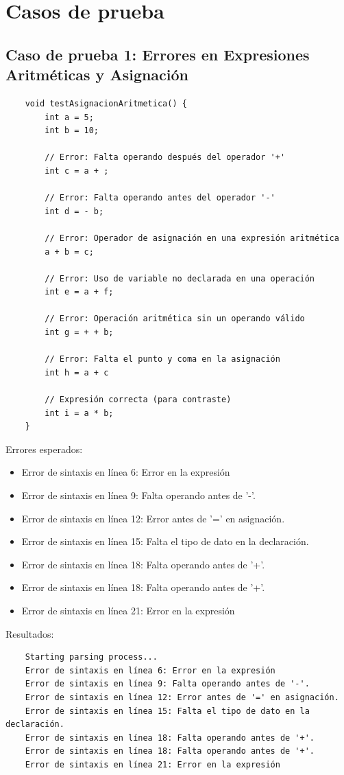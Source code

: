 \documentclass[a4paper,12pt]{article}
\begin{document}
\newpage

\section*{Casos de prueba}
\subsection*{Caso de prueba 1: Errores en Expresiones Aritméticas y Asignación}
\begin{flushleft}
    \begin{verbatim}
	void testAsignacionAritmetica() {
		int a = 5;
		int b = 10;
		
		// Error: Falta operando después del operador '+'
		int c = a + ;
		
		// Error: Falta operando antes del operador '-'
		int d = - b;
		
		// Error: Operador de asignación en una expresión aritmética
		a + b = c; 
		
		// Error: Uso de variable no declarada en una operación
		int e = a + f;
		
		// Error: Operación aritmética sin un operando válido
		int g = + + b;
		
		// Error: Falta el punto y coma en la asignación
		int h = a + c
		
		// Expresión correcta (para contraste)
		int i = a * b;
	}
    \end{verbatim}
    Errores esperados:
    \begin{itemize}
	\item Error de sintaxis en línea 6: Error en la expresión
	\item Error de sintaxis en línea 9: Falta operando antes de '-'.
	\item Error de sintaxis en línea 12: Error antes de '=' en asignación.
	\item Error de sintaxis en línea 15: Falta el tipo de dato en la declaración.
	\item Error de sintaxis en línea 18: Falta operando antes de '+'.
	\item Error de sintaxis en línea 18: Falta operando antes de '+'.
	\item Error de sintaxis en línea 21: Error en la expresión
    \end{itemize}
    Resultados:
    \begin{verbatim}
	Starting parsing process...
	Error de sintaxis en línea 6: Error en la expresión
	Error de sintaxis en línea 9: Falta operando antes de '-'.
	Error de sintaxis en línea 12: Error antes de '=' en asignación.
	Error de sintaxis en línea 15: Falta el tipo de dato en la declaración.
	Error de sintaxis en línea 18: Falta operando antes de '+'.
	Error de sintaxis en línea 18: Falta operando antes de '+'.
	Error de sintaxis en línea 21: Error en la expresión
    \end{verbatim}
\end{flushleft}
\end{document}
